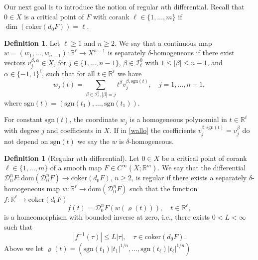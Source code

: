 \documentclass[12pt, reqno]{amsart}
\theoremstyle{plain}
\theoremstyle{definition}
\newtheorem{definition}[theorem]{Definition}
\theoremstyle{remark}
\numberwithin{equation}{section}
\newcommand{\R}{\mathbb{R}}
\newcommand{\0}{\theta}
\renewcommand{\b}{\beta}
\newcommand{\1}{{-1}}
\newcommand{\sgn}{\mathrm{sgn}}
\renewcommand{\l}{\ell}
\renewcommand{\=}{\coloneqq}
\renewcommand{\.}{\dots}
\newcommand{\mc}{\mathcal}
\newcommand{\coker}{\mathrm{coker}}
\newcommand{\dom}{\mathrm{dom}}
\begin{document}
{\color{black}
Our next goal is to introduce the notion of regular $n$th differential. Recall that 
  $0\in X$ is a critical point of $F$ with corank $\l\in\{1,\dots,m\}$ if  
 $\dim( \coker (d_0F)) =  \l$.
 
 \begin{definition} Let $\ell\geq 1$ and $n\geq 2$. 
 We say that a continuous map $w=(w_1,\ldots, w_{n-1}): \R^\ell\to X^{n-1}$ is separately $\delta$-homogeneous if there exist vectors 
 $v_j^{\b,\alpha} \in X$, for  $j\in\{1,\ldots,n-1\}$, $\b\in  \mathscr I_\l^0$ with $1\leq |\beta|\leq n-1$, and $\alpha \in \{-1,1\}^\ell$, such that  for all $t\in\R^\ell$ we have 
 \begin{equation} 
 \label{wallo}
 w_j(t)=\sum_{\b\in \mathscr I_\l^0,|\b|=j}t^\b v_j^{\b,\mathrm{sgn} (t)} ,\quad j=1,\ldots, n-1,
\end{equation}
where $\mathrm{sgn} (t )= ( \mathrm{sgn}( t_1 ),\ldots,\mathrm{sgn} (t_1) )$. 

\end{definition}


For constant $\mathrm{sgn}(t)$, the coordinate $w_j$ is  a homogeneous polynomial in $t\in\R^\ell$ with degree $j$ and coefficients in $X$.
If in \eqref{wallo} the coefficients $v_j^{\b,\mathrm{sgn} (t)}=v_j^{\b}$ do not depend on $\sgn(t)$ we say the $w$ is $\delta$-homogeneous.







\begin{definition}[Regular $n$th differential]
\label{REGO} 
Let 
$0\in X$ be  a critical point of corank $\l\in\{1,\dots, m\}$ of a smooth map
$ F\in C^\infty(X;\R^m)$.
We say that the differential $  \mc D_0^n F:\dom(\mc D_0^n F)\to \coker(d_0F)$, $n\geq 2$, is regular if there exists a separately $\delta$-homogeneous map $w:\R^\ell\to \dom(\mc D_0^n F)$ such that
the function
		$f: \R^\l\to
		\coker (d_0 F)$
		\begin{equation}\label{faf}
		     f(t) = \mc D_0^n F(w(\varrho(t))   ), \quad t\in \R^\l ,
		\end{equation}
		is a homeomorphism  with bounded  inverse at zero, i.e.,  there exists  $0<L<\infty$ such that 
		\begin{equation}\label{INVO}
      |f^{-1} (\tau)|\leq L |\tau|,\quad \tau \in\coker(d_0F).
      \end{equation} 
      Above we let $\varrho(t)=\left(\mathrm{sgn}(t_1)|t_1|^{1/n},\dots,\mathrm{sgn}(t_\l)|t_\l|^{1/n}\right)$ 
 \end{definition}


}
\end{document}
